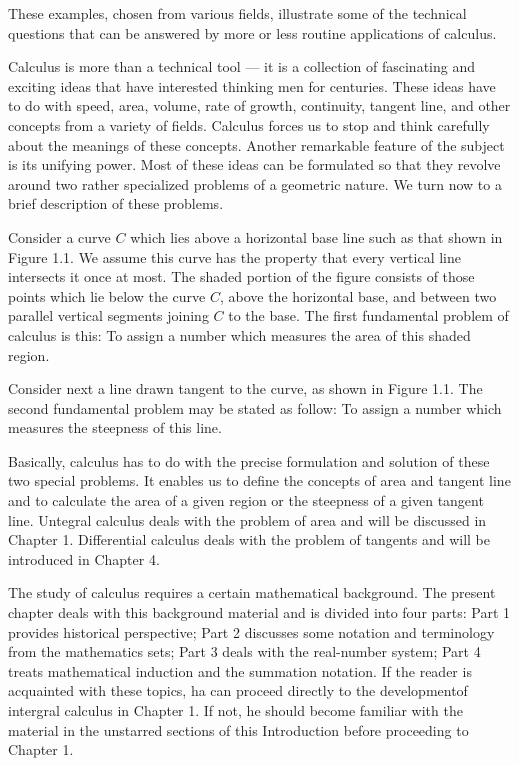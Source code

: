 \documentclass[cn,11pt,chinese]{elegantbook}
\numberwithin{equation}{section}
\begin{document}
These examples, chosen from various fields, illustrate some of the technical questions that can be answered by more or less routine applications of calculus.

Calculus is more than a technical tool --- it is a collection of fascinating and exciting ideas that have interested thinking men for centuries. These ideas have to do with speed, area, volume, rate of growth, continuity, tangent line, and other concepts from a variety of fields. Calculus forces us to stop and think carefully about the meanings  of these concepts. Another remarkable feature of the subject is its unifying power. Most of these ideas can be formulated so that they revolve around two rather specialized problems of a geometric nature. We turn now to a brief description of these problems.

Consider a curve $C$ which lies above a horizontal base line such as that shown in Figure 1.1. We assume this curve has the property that every vertical line intersects it once at most. The shaded portion of the figure consists of those points which lie below the curve $C$, above the horizontal base, and between two parallel vertical segments joining $C$ to the base. The first fundamental problem of calculus is this: To assign a number which measures the area of this shaded region.

Consider next a line drawn tangent to the curve, as shown in  Figure 1.1. The second fundamental problem may be stated as follow: To assign a number which measures the steepness of this line.

Basically, calculus has to do with the precise formulation and solution of these two special problems. It enables us to define the concepts of area and tangent line and to calculate the area of a given region or the steepness of a given tangent line. Untegral calculus deals with the problem of area and will be discussed in Chapter 1. Differential calculus deals with the problem of tangents and will be introduced in Chapter 4.

The study of calculus requires a certain mathematical background. The present chapter deals with this background material and is divided into four parts: Part 1 provides historical perspective; Part 2 discusses some notation and terminology from the mathematics sets; Part 3 deals with the real-number system; Part 4 treats mathematical induction and the summation notation. If the reader is acquainted with these topics, ha can proceed directly to the developmentof intergral calculus in Chapter 1. If not, he should become familiar with the material in the unstarred sections of this Introduction before proceeding to Chapter 1.
\end{document}
